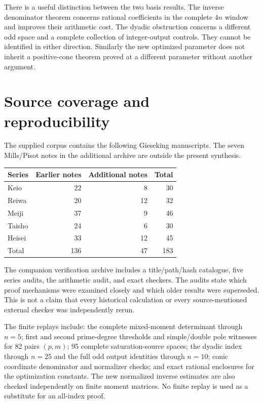 \documentclass[11pt,a4paper]{article}
\numberwithin{equation}{section}
\theoremstyle{definition}\newtheorem{definition}[theorem]{Definition}
\theoremstyle{remark}\newtheorem{remark}[theorem]{Remark}
\begin{document}
There is a useful distinction between the two basis results. The inverse
denominator theorem concerns rational coefficients in the complete $4n$
window and improves their arithmetic cost. The dyadic obstruction concerns
a different odd space and a complete collection of integer-output controls.
They cannot be identified in either direction. Similarly the new optimized
parameter does not inherit a positive-cone theorem proved at a different
parameter without another argument.

\appendix
\section{Source coverage and reproducibility}
The supplied corpus contains the following Gieseking manuscripts. The seven
Mills/Pisot notes in the additional archive are outside the present synthesis.
\begin{center}
\begin{tabular}{lrrr}\toprule
Series & Earlier notes & Additional notes & Total\\\midrule
Keio &22&8&30\\
Reiwa &20&12&32\\
Meiji &37&9&46\\
Taisho &24&6&30\\
Heisei &33&12&45\\\midrule
Total &136&47&183\\\bottomrule
\end{tabular}
\end{center}
The companion verification archive includes a title/path/hash catalogue,
five series audits, the arithmetic audit, and exact checkers. The audits
state which proof mechanisms were examined closely and which older results
were superseded. This is not a claim that every historical calculation or
every source-mentioned external checker was independently rerun.

The finite replays include: the complete mixed-moment determinant through
$n=5$; first and second prime-degree thresholds and simple/double pole
witnesses for 82 pairs $(p,m)$; 95 complete saturation-source spaces;
the dyadic index through $n=25$ and the full odd output identities through
$n=10$; conic coordinate denominator and normalizer checks; and exact rational
enclosures for the optimization constants. The new normalized inverse
estimates are also checked independently on finite moment matrices.
No finite replay is used as a substitute for an all-index proof.
\end{document}
